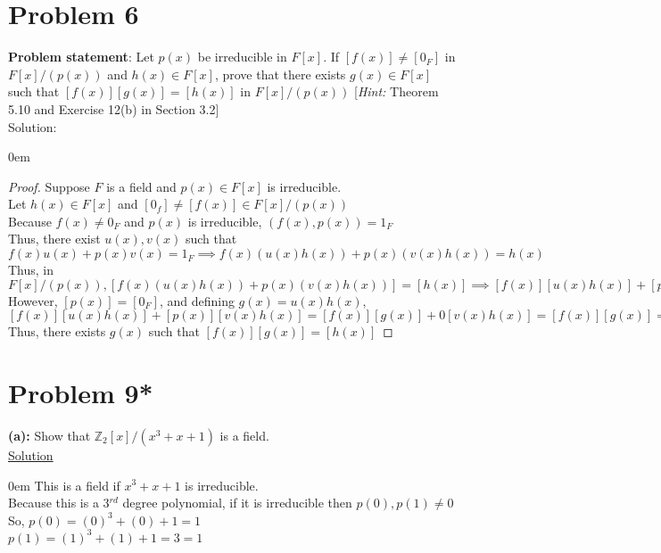 \documentclass{article} %
\begin{document}
\newpage

\section*{Problem 6}


\textbf{Problem statement}: Let $p(x)$ be irreducible in $F[x]$.  If $[f(x)] \neq [0_F]$ in $F[x]/(p(x))$ and $h(x) \in F[x]$, prove that there exists $g(x) \in F[x]$ such that $[f(x)][g(x)] = [h(x)]$ in $F[x]/(p(x))$ [\textit{Hint: } Theorem 5.10 and Exercise 12(b) in Section 3.2]
\\

Solution: 
\begin{addmargin}[1em]{0em}
\begin{proof}
Suppose $F$ is a field and $p(x) \in F[x]$ is irreducible.
\\Let $h(x) \in F[x]$ and $[0_f] \neq [f(x)] \in F[x]/(p(x))$
\\Because $f(x) \neq 0_F$ and $p(x)$ is irreducible, $(f(x), p(x)) = 1_F$
\\Thus, there exist $u(x), v(x)$ such that $f(x)u(x) + p(x)v(x) = 1_F \implies f(x)(u(x)h(x)) + p(x)(v(x)h(x)) = h(x)$
\\Thus, in $F[x]/(p(x)), [f(x)(u(x)h(x)) + p(x)(v(x)h(x))] = [h(x)] \implies [f(x)][u(x)h(x)] + [p(x)][v(x)h(x)] = [h(x)]$
\\However, $[p(x)] = [0_F]$, and defining $g(x) = u(x)h(x)$, $[f(x)][u(x)h(x)] + [p(x)][v(x)h(x)] = [f(x)][g(x)] + 0[v(x)h(x)] = [f(x)][g(x)] = [h(x)]$
\\Thus, there exists $g(x)$ such that $[f(x)][g(x)] = [h(x)]$
\end{proof}
\end{addmargin}

\newpage

\section*{Problem 9*}

\textbf{(a):} Show that $\mathbb{Z}_2[x]/(x^3 + x + 1)$ is a field.
\\

\underline{Solution}
\begin{addmargin}[1em]{0em}
This is a field if $x^3 + x + 1$ is irreducible.
\\Because this is a 3$^{rd}$ degree polynomial, if it is irreducible then $p(0), p(1) \neq 0$
\\So, $p(0) = (0)^3 + (0) + 1 = 1$
\\$p(1) = (1)^3 + (1) + 1 = 3 = 1$
\end{addmargin}
\end{document}

